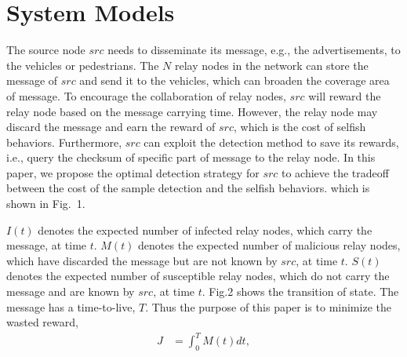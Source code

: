 \section{System Models}
\label{sec:sys_model}
The source node $src$ needs to 
disseminate its message, 
e.g., the advertisements,
to the vehicles or pedestrians.
The $N$ relay nodes in the network can store the message of $src$
and send it to the vehicles,
which can broaden the coverage area of message.
To encourage the collaboration of relay nodes,
$src$ will reward the relay node based on the message carrying time.
However, the relay node may discard the message and
earn the reward of $src$, which is the cost of selfish behaviors.
Furthermore, $src$ can exploit the detection method to save its rewards,
i.e., query the checksum of specific part of message
to the relay node. 
In this paper, we propose the optimal detection strategy for $src$
to achieve the tradeoff between 
the cost of the sample detection and the selfish behaviors.
which is shown in Fig.~1.

$I(t)$ denotes the expected number of infected relay nodes,
which carry the message,
at time $t$.
$M(t)$ denotes the expected number of malicious relay nodes,
which have discarded the message but are not known by $src$,
at time $t$.
$S(t)$ denotes the expected number of susceptible relay nodes,
which do not carry the message and are known by $src$,
at time $t$.
Fig.2 shows the transition of state.
The message has a time-to-live, $T$.
Thus the purpose of this paper is to minimize the wasted reward,
\begin{equation}
\nonumber
\begin{aligned}
J &= \int_{0}^{T} M(t) dt,
\end{aligned}
\end{equation}
